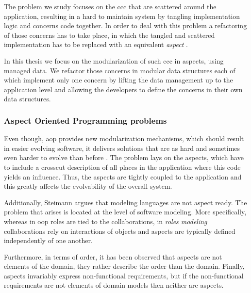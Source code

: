 The problem we study focuses on the \ac{ccc} that are scattered around the application, resulting in a hard to maintain system 
by tangling implementation logic and concerns code together. 
In order to deal with this problem a refactoring of those concerns has to take place, in which the tangled and scattered implementation has to be replaced with an equivalent \textit{aspect} \cite{hannemann2005role}.

In this thesis we focus on the modularization of such \ac{ccc} in aspects, using managed data. 
We refactor those concerns in modular data structures each of which implement only one concern by lifting the data management up to the application level and allowing the developers to define the concerns in their own data structures.

\subsubsection{Aspect Oriented Programming problems}\label{Aspect Oriented Programming problem}

Even though, \ac{aop} provides new modularization mechanisms, which should result in easier evolving software, 
it delivers solutions that are as hard and sometimes even harder to evolve than before \cite{tourwe2003existence}. 
The problem lays on the aspects, which have to include a crosscut description of all places in the application where this code yields an influence. 
Thus, the aspects are tightly coupled to the application and this greatly affects the evolvability of the overall system. 

Additionally, Steimann \cite{steimann2005domain} argues that modeling languages are not aspect ready. 
The problem that arises is located at the level of software modeling. 
More specifically, whereas in \ac{oop} roles are tied to the collaborations, in \textit{roles modeling} collaborations rely on interactions of objects and aspects are typically defined independently of one another.

Furthermore, in terms of order, it has been observed that aspects are not elements of the domain, they rather describe the order than the domain. 
Finally, aspects invariably express non-functional requirements, but if the non-functional requirements are not elements of domain models then neither are aspects.

